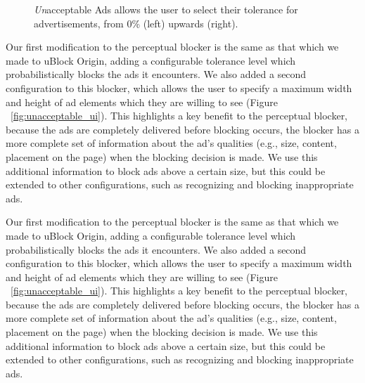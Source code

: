 \begin{figure}[t]
\hfill
{}
\hfill
{}
\hfill
\caption{\textit{Un}acceptable Ads allows the user to select their tolerance for advertisements, from 0\% (left) upwards (right).}
\label{fig:unacceptable}
\end{figure}

Our first modification to the perceptual blocker is the same as that which we made to uBlock Origin, adding a configurable tolerance level which probabilistically blocks the ads it encounters.
We also added a second configuration to this blocker, which allows the user to specify a maximum width and height of ad elements which they are willing to see (Figure ~\ref{fig:unacceptable_ui}).
This highlights a key benefit to the perceptual blocker, because the ads are completely delivered before blocking occurs, the blocker has a more complete set of information about the ad's qualities (e.g., size, content, placement on the page) when the blocking decision is made.
We use this additional information to block ads above a certain size, but this could be extended to other configurations, such as recognizing and blocking inappropriate ads.


Our first modification to the perceptual blocker is the same as that which we made to uBlock Origin, adding a configurable tolerance level which probabilistically blocks the ads it encounters.
We also added a second configuration to this blocker, which allows the user to specify a maximum width and height of ad elements which they are willing to see (Figure ~\ref{fig:unacceptable_ui}).
This highlights a key benefit to the perceptual blocker, because the ads are completely delivered before blocking occurs, the blocker has a more complete set of information about the ad's qualities (e.g., size, content, placement on the page) when the blocking decision is made.
We use this additional information to block ads above a certain size, but this could be extended to other configurations, such as recognizing and blocking inappropriate ads.

